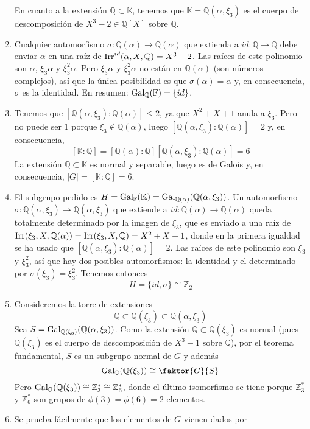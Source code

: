 \documentclass[11pt]{report}
\makeatletter
\renewenvironment{proof}[1][\proofname]{\par
  \pushQED{\qed}%
  \normalfont \topsep\z@skip %
  \trivlist
  \item[\hskip\labelsep
        \itshape
    #1\@addpunct{.}]\ignorespaces
}{%
  \popQED\endtrivlist\@endpefalse
}
\newcommand{\Z}{\mathbb Z}
\newcommand{\Q}{\mathbb Q}
\newcommand{\F}{\mathbb F}
\newcommand{\K}{\mathbb K}
\makeatother
\begin{document}
\begin{proof}
\begin{enumerate}
    En cuanto a la extensión $\Q \subset \K$, tenemos que $\K=\Q(\alpha,\xi_3)$ es el cuerpo de descomposición de $X^3-2 \in \Q[X]$ sobre $\Q$.
    \item Cualquier automorfismo $\sigma \colon \Q(\alpha) \to \Q(\alpha)$ que extienda a $id \colon \Q \to \Q$ debe enviar $\alpha$ en una raíz de $\textup{Irr}^{id}(\alpha,X,\Q) = X^3-2$. Las raíces de este polinomio son $\alpha$, $\xi_3\alpha$ y $\xi_3^2\alpha$. Pero $\xi_3\alpha$ y $\xi_3^2\alpha$ no están en $\Q(\alpha)$ (son números complejos), así que la única posibilidad es que $\sigma(\alpha) = \alpha$ y, en consecuencia, $\sigma$ es la identidad. En resumen: $\textup{Gal}_\Q(\F) = \{id\}$.
    \item Tenemos que $[\Q(\alpha,\xi_3) \colon \Q(\alpha)] \leq 2$, ya que $X^2+X+1$ anula a $\xi_3$. Pero no puede ser $1$ porque $\xi_3 \not\in \Q(\alpha)$, luego $[\Q(\alpha,\xi_3) \colon \Q(\alpha)] = 2$ y, en consecuencia,
    \[[\K \colon \Q] = [\Q(\alpha) \colon \Q][\Q(\alpha,\xi_3) \colon \Q(\alpha)] = 6\] La extensión $\Q \subset \K$ es normal y separable, luego es de Galois y, en consecuencia, $|G| = [\K \colon \Q] = 6$.
    \item El subgrupo pedido es $H = \textup{Gal}_\F(\K) = \textup{Gal}_{\Q(\alpha)}(\Q(\alpha,\xi_3))$. Un automorfismo $\sigma \colon \Q(\alpha,\xi_3) \to \Q(\alpha,\xi_3)$ que extiende a $id \colon \Q(\alpha) \to \Q(\alpha)$ queda totalmente determinado por la imagen de $\xi_3$, que es enviado a una raíz de $\textup{Irr}(\xi_3,X,\Q(\alpha)) = \textup{Irr}(\xi_3,X,\Q) = X^2+X+1$, donde en la primera igualdad se ha usado que $[\Q(\alpha,\xi_3) \colon \Q(\alpha)] = 2$. Las raíces de este polinomio son $\xi_3$ y $\xi_3^2$, así que hay dos posibles automorfismos: la identidad y el determinado por $\sigma(\xi_3) = \xi_3^2$. Tenemos entonces
    \[H = \{id, \sigma\} \cong \Z_2\]
    \item Consideremos la torre de extensiones
    \[\Q \subset \Q(\xi_3) \subset \Q(\alpha,\xi_3)\]
    Sea $S = \textup{Gal}_{\Q(\xi_3)}(\Q(\alpha,\xi_3))$. Como la extensión $\Q \subset \Q(\xi_3)$ es normal (pues $\Q(\xi_3)$ es el cuerpo de descomposición de $X^3-1$ sobre $\Q$), por el teorema fundamental, $S$ es un subgrupo normal de $G$ y además
    \[\textup{Gal}_\Q(\Q(\xi_3)) \cong \faktor{G}{S}\]
    Pero $\textup{Gal}_\Q(\Q(\xi_3)) \cong \Z_3^*\cong \Z_6^*$, donde el último isomorfismo se tiene porque $\Z_3^*$ y $\Z_6^*$ son grupos de $\phi(3)=\phi(6)=2$ elementos.
    \item Se prueba fácilmente que los elementos de $G$ vienen dados por

\end{enumerate}
\end{proof}
\end{document}

